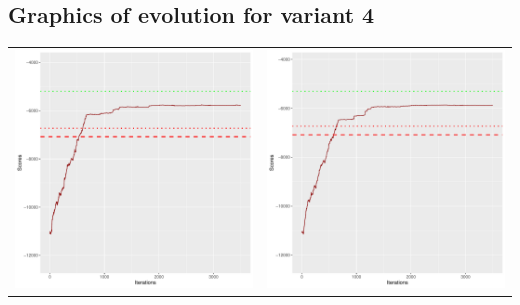 \documentclass[]{scrartcl}
\begin{document}
\clearpage

\subsection{Graphics of evolution for variant 4}

\begin{table}[h!]
\begin{tabular}{cc}
\includegraphics[scale = 0.4]{./figs/alarm/v4/30/boundsEvolution-3502.pdf} & 
\includegraphics[scale = 0.4]{./figs/alarm/v4/50/boundsEvolution-3502.pdf} \\

\end{tabular}
\end{table}
\end{document}
